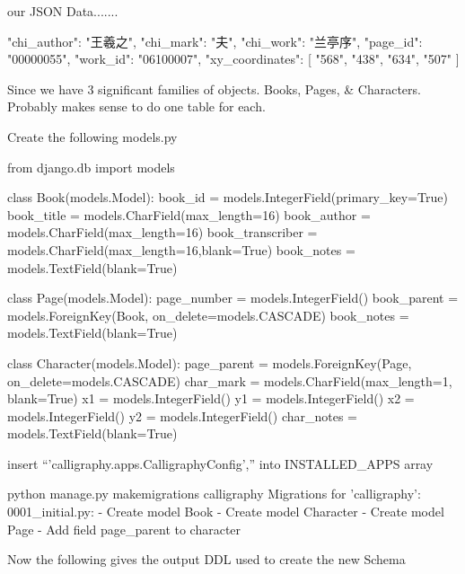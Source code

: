 our JSON Data.......

    {
        "chi_author": "王羲之",
        "chi_mark": "夫",
        "chi_work": "兰亭序",
        "page_id": "00000055",
        "work_id": "06100007",
        "xy_coordinates": [
            "568",
            "438",
            "634",
            "507"
        ]
    }
    
    
    
    Since we have 3 significant families of objects.  Books, Pages, & Characters.  Probably makes sense to do one table for each.
    
Create the following models.py

from django.db import models


class Book(models.Model):
    book_id = models.IntegerField(primary_key=True)
    book_title = models.CharField(max_length=16)
    book_author = models.CharField(max_length=16)
    book_transcriber = models.CharField(max_length=16,blank=True)
    book_notes = models.TextField(blank=True)


class Page(models.Model):
    page_number = models.IntegerField()
    book_parent = models.ForeignKey(Book, on_delete=models.CASCADE)
    book_notes = models.TextField(blank=True)


class Character(models.Model):
    page_parent = models.ForeignKey(Page, on_delete=models.CASCADE)
    char_mark = models.CharField(max_length=1, blank=True)
    x1 = models.IntegerField()
    y1 = models.IntegerField()
    x2 = models.IntegerField()
    y2 = models.IntegerField()
    char_notes = models.TextField(blank=True)
    
    
insert ``'calligraphy.apps.CalligraphyConfig','' into INSTALLED_APPS array

python manage.py makemigrations calligraphy
Migrations for 'calligraphy':
  0001_initial.py:
    - Create model Book
    - Create model Character
    - Create model Page
    - Add field page_parent to character
    
Now the following gives the output DDL used to create the new Schema

